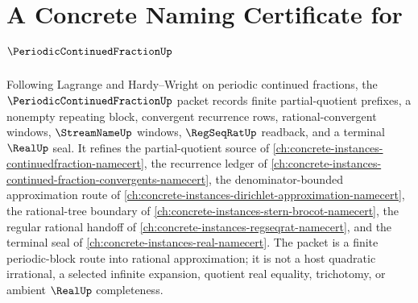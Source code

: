 \chapter{A Concrete Naming Certificate for $\PeriodicContinuedFractionUp$}
\label{ch:concrete-instances-periodic-continued-fraction-namecert}

Following Lagrange and Hardy--Wright on periodic continued fractions, the $\PeriodicContinuedFractionUp$ packet records finite partial-quotient prefixes, a nonempty repeating block, convergent recurrence rows, rational-convergent windows, $\StreamNameUp$ windows, $\RegSeqRatUp$ readback, and a terminal $\RealUp$ seal. It refines the partial-quotient source of \autoref{ch:concrete-instances-continuedfraction-namecert}, the recurrence ledger of \autoref{ch:concrete-instances-continued-fraction-convergents-namecert}, the denominator-bounded approximation route of \autoref{ch:concrete-instances-dirichlet-approximation-namecert}, the rational-tree boundary of \autoref{ch:concrete-instances-stern-brocot-namecert}, the regular rational handoff of \autoref{ch:concrete-instances-regseqrat-namecert}, and the terminal seal of \autoref{ch:concrete-instances-real-namecert}. The packet is a finite periodic-block route into rational approximation; it is not a host quadratic irrational, a selected infinite expansion, quotient real equality, trichotomy, or ambient $\RealUp$ completeness.


